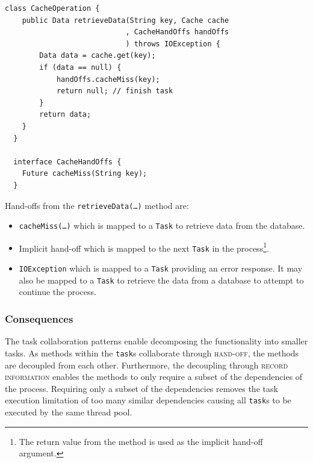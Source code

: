 \documentclass[prodmode]{style/acmlarge}
\begin{document}
\begin{lstlisting}[float,label=lst:Example_Method_Task]
  class CacheOperation {
    public Data retrieveData(String key, Cache cache
                            , CacheHandOffs handOffs
                            ) throws IOException {
        Data data = cache.get(key);
        if (data == null) {
            handOffs.cacheMiss(key);
            return null; // finish task
        }
        return data;
    }
  }

  interface CacheHandOffs {
    Future cacheMiss(String key);
  }
\end{lstlisting}

Hand-offs from the \texttt{retrieveData(\ldots)} method are:
\begin{itemize}
  \item \texttt{cacheMiss(\ldots)} which is mapped to a \texttt{Task} to retrieve data from the database.
  \item Implicit hand-off which is mapped to the next \texttt{Task} in the process\footnote{The return value from the method is used as the implicit hand-off argument.}.
  \item \texttt{IOException} which is mapped to a \texttt{Task} providing an error response.  It may also be mapped to a \texttt{Task} to retrieve the data from a database to attempt to continue the process.
\end{itemize}


\subsubsection*{Consequences}

The task collaboration patterns enable decomposing the functionality into
smaller tasks.  As methods within the \texttt{task}s collaborate through
\textsc{hand-off}, the methods are decoupled from each other.  Furthermore, the
decoupling through \textsc{record information} enables the methods to only
require a subset of the dependencies of the process.  Requiring only a subset of
the dependencies removes the task execution limitation of too many similar
dependencies causing all \texttt{task}s to be executed by the same thread pool.
\end{document}
